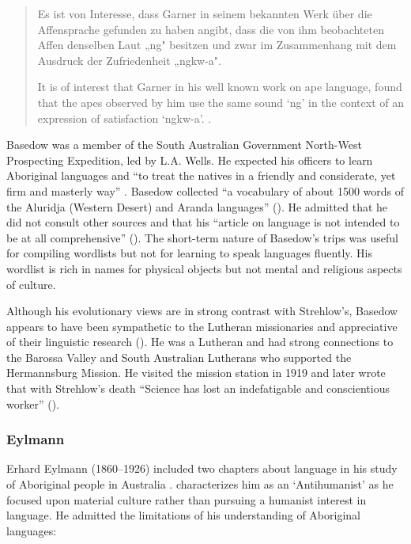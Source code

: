 \documentclass[english,output=paper,colorlinks,citecolor=brown]{../langscibook}
\begin{document}
\begin{quote}
    Es ist von Interesse, dass Garner in seinem bekannten Werk über die Affensprache gefunden zu haben angibt, dass die von ihm beobachteten Affen denselben Laut „ng" besitzen und zwar im Zusammenhang mit dem Ausdruck der Zufriedenheit „ngkw-a". 

    It is of interest that Garner in his well known work on ape language, found that the apes observed by him use the same sound ‘ng’ in the context of an expression of satisfaction ‘ngkw-a’. \citep[208]{Basedow1908}.
\end{quote}

Basedow was a member of the South Australian Government North-West Pros\-pec\-ting Expedition, led by L.A. Wells. He expected his officers to learn Aboriginal languages and “to treat the natives in a friendly and considerate, yet firm and masterly way” \citep[49]{Zogbaum2010}. Basedow collected “a vocabulary of about 1500 words of the Aluridja (Western Desert) and Aranda languages” (\citealt[v]{Harmstorf2004}). He admitted that he did not consult other sources and that his “article on language is not intended to be at all comprehensive” (\citealt[xii]{Basedow1925}). The short-term nature of Basedow’s trips was useful for compiling wordlists but not for learning to speak languages fluently. His wordlist \citep{Basedow1908} is rich in names for physical objects but not mental and religious aspects of culture.

Although his evolutionary views are in strong contrast with Strehlow’s, Basedow appears to have been sympathetic to the Lutheran missionaries and appreciative of their linguistic research (\citealt[vi]{Harmstorf2004}). He was a Lutheran and had strong connections to the Barossa Valley and South Australian Lutherans who supported the Hermannsburg Mission. He visited the mission station in 1919 and later wrote that with Strehlow’s death ``Science has lost an indefatigable and conscientious worker'' (\citealt[ix]{Basedow1925}). 

\subsubsection{Eylmann}

Erhard Eylmann (1860--1926) included two chapters about language in his study of Aboriginal people in Australia \citep{Eylmann1908}. \citet[34]{Monteath2013} characterizes him as an ‘Antihumanist’ as he focused upon material culture rather than pursuing a humanist interest in language. He admitted the limitations of his understanding of Aboriginal languages:
\end{document}
